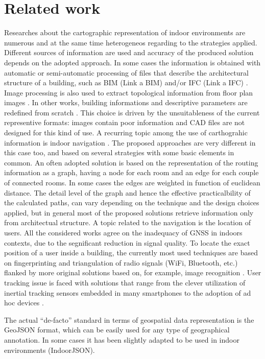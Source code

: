 \section{Related work}\label{related-work}

Researches about the cartographic representation of indoor environments are
numerous and at the same time heterogeneos regarding to the strategies
applied. Different sources of information are used and accuracy of the
produced solution depends on the adopted approach. In some cases the
information is obtained with automatic or semi-automatic processing of files
that describe the architectural structure of a building, such as BIM (Link a
BIM) and/or IFC (Link a IFC) \cite{6816739}. Image processing is also used to
extract topological information from floor plan images \cite{6878152}. In
other works, building informations and descriptive parameters are redefined
from scratch \cite{6418876}. This choice is driven by the unsuitableness of
the current representive formats: images contain poor information and CAD
files are not designed for this kind of use. A recurring topic among the use
of carthograhic information is indoor navigation
\cite{6878152,6418876,6816739}. The proposed approaches are very different in
this case too, and based on several strategies with some basic elements in
common. An often adopted solution is based on the representation of the
routing information as a graph, having a node for each room and an edge for
each couple of connected rooms. In some cases the edges are weighted in
function of euclidean distance. The detail level of the graph and hence the
effective practicalbility of the calculated paths, can vary depending on the
technique and the design choices applied, but in general most of the proposed
solutions retrieve information only from architectual structure. A topic
related to the navigation is the location of users. All the considered works
agree on the inadequacy of GNSS in indoors contexts, due to the segnificant
reduction in signal quality. To locate the exact position of a user inside a
building, the currently most used techniques are based on fingerprinting and
triangulation of radio signals (WiFi, Bluetooth, etc.) flanked by more
original solutions based on, for example, image recognition \cite{6815564}.
User tracking issue is faced with solutions that range from the clever
utilization of inertial tracking sensors embedded in many smartphones
\cite{6815564} to the adoption of ad hoc devices \cite{6878152}.

The actual ``de-facto'' standard in terms of geospatial data representation is
the GeoJSON format, which can be easily used for any type of geographical
annotation. In some cases it has been slightly adapted to be used in indoor
environments (IndoorJSON).

